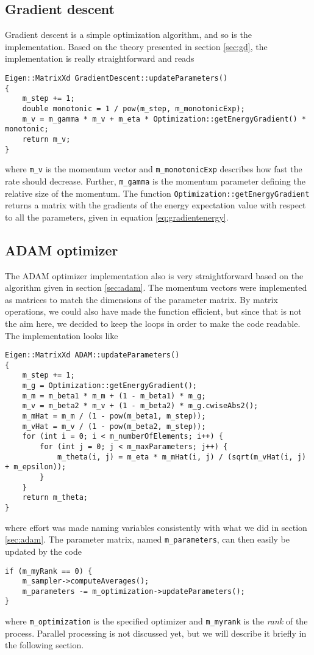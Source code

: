 \subsection{Gradient descent}
Gradient descent is a simple optimization algorithm, and so is the implementation. Based on the theory presented in section \ref{sec:gd}, the implementation is really straightforward and reads
\begin{lstlisting}
Eigen::MatrixXd GradientDescent::updateParameters()
{
	m_step += 1;
	double monotonic = 1 / pow(m_step, m_monotonicExp);
	m_v = m_gamma * m_v + m_eta * Optimization::getEnergyGradient() * monotonic;
	return m_v;
}
\end{lstlisting}
where \lstinline|m_v| is the momentum vector and \lstinline|m_monotonicExp| describes how fast the rate should decrease. Further, \lstinline|m_gamma| is the momentum parameter defining the relative size of the momentum. The function \lstinline|Optimization::getEnergyGradient| returns a matrix with the gradients of the energy expectation value with respect to all the parameters, given in equation \eqref{eq:gradientenergy}.

\subsection{ADAM optimizer}
The ADAM optimizer implementation also is very straightforward based on the algorithm given in section \ref{sec:adam}. The momentum vectors were implemented as matrices to match the dimensions of the parameter matrix. By matrix operations, we could also have made the function efficient, but since that is not the aim here, we decided to keep the loops in order to make the code readable. The implementation looks like
\begin{lstlisting}
Eigen::MatrixXd ADAM::updateParameters()
{
	m_step += 1;
	m_g = Optimization::getEnergyGradient();
	m_m = m_beta1 * m_m + (1 - m_beta1) * m_g;
	m_v = m_beta2 * m_v + (1 - m_beta2) * m_g.cwiseAbs2();
	m_mHat = m_m / (1 - pow(m_beta1, m_step));
	m_vHat = m_v / (1 - pow(m_beta2, m_step));
	for (int i = 0; i < m_numberOfElements; i++) {
		for (int j = 0; j < m_maxParameters; j++) {
			m_theta(i, j) = m_eta * m_mHat(i, j) / (sqrt(m_vHat(i, j) + m_epsilon));
		}
	}
	return m_theta;
}
\end{lstlisting}
where effort was made naming variables consistently with what we did in section \ref{sec:adam}. The parameter matrix, named \lstinline|m_parameters|, can then easily be updated by the code
\begin{lstlisting}
if (m_myRank == 0) {
	m_sampler->computeAverages();
	m_parameters -= m_optimization->updateParameters();
}
\end{lstlisting}
where \lstinline|m_optimization| is the specified optimizer and \lstinline|m_myrank| is the \textit{rank} of the process. Parallel processing is not discussed yet, but we will describe it briefly in the following section.

